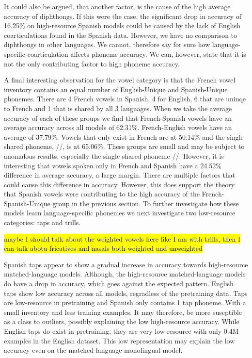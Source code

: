 It could also be argued, that another factor, is the cause of the high average accuracy of diphthongs. If this were the case, the significant drop in accuracy of 16.25\% on high-resource Spanish models could be caused by the lack of English coarticulations found in the Spanish data. However, we have no comparison to diphthongs in other languages. We cannot, therefore say for sure how language-specific coarticulation affects phoneme accuracy. We can, however, state that it is not the only contributing factor to high phoneme accuracy.

A final interesting observation for the vowel category is that the French vowel inventory contains an equal number of English-Unique and Spanish-Unique phonemes. There are 4 French vowels in Spanish, 4 for English, 6 that are uniuqe to French and 1 that is shared by all 3 languages. When we take the average accuracy of each of these groups we find that French-Spanish vowels have an average accuracy across all models of 62.31\%. French-English vowels have an average of 37.79\%. Vowels that only exist in French are at 50.14\% and the single shared phoneme, //, is at 65.06\%. These groups are small and may be subject to anomalous results, especially the single shared phoneme //. However, it is interesting that vowels spoken only in French and Spanish have a 24.52\% difference in average accuracy, a large margin. There are multiple factors that could cause this difference in accuracy. However, this does support the theory that Spanish vowels were contributing to the high accuracy of the French-Spanish-Unique group in the previous section. To further investigate how these models learn language-specific phonemes we next investigate two low-resource categories: taps and trills.

\hl{maybe I should talk about the weighted vowels here like I am with trills, then I can talk abotu fricatives and nasals both weighted and unweighted}

Spanish taps appear to show a gradual increase in accuracy towards high-resource matched-language models. Although, the high-resource matched-language models do have a drop in accuracy, which goes against the expected pattern. English taps show low accuracy across all models, regradless of the pretraining data. Taps are low-resource in pretraining and Spanish only contains 1 tap phoneme. With a small inventory and less training examples. It may therefore, be more suseptible as a class to outliers, possibly explaining the low high-resource accuracy. While English taps do exist in pretraining, they are very low-resource with only 0.4M examples in the English dataset. This low representation may explain the low accuracy even on the matched-language monolingual model.

